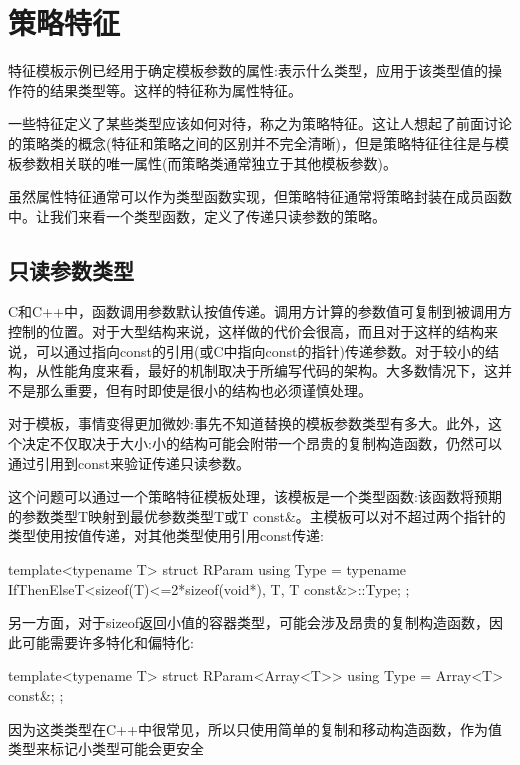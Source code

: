 \section{策略特征}

特征模板示例已经用于确定模板参数的属性:表示什么类型，应用于该类型值的操作符的结果类型等。这样的特征称为属性特征。

一些特征定义了某些类型应该如何对待，称之为策略特征。这让人想起了前面讨论的策略类的概念(特征和策略之间的区别并不完全清晰)，但是策略特征往往是与模板参数相关联的唯一属性(而策略类通常独立于其他模板参数)。

虽然属性特征通常可以作为类型函数实现，但策略特征通常将策略封装在成员函数中。让我们来看一个类型函数，定义了传递只读参数的策略。

\subsection{只读参数类型}

C和C++中，函数调用参数默认按值传递。调用方计算的参数值可复制到被调用方控制的位置。对于大型结构来说，这样做的代价会很高，而且对于这样的结构来说，可以通过指向const的引用(或C中指向const的指针)传递参数。对于较小的结构，从性能角度来看，最好的机制取决于所编写代码的架构。大多数情况下，这并不是那么重要，但有时即使是很小的结构也必须谨慎处理。

对于模板，事情变得更加微妙:事先不知道替换的模板参数类型有多大。此外，这个决定不仅取决于大小:小的结构可能会附带一个昂贵的复制构造函数，仍然可以通过引用到const来验证传递只读参数。

这个问题可以通过一个策略特征模板处理，该模板是一个类型函数:该函数将预期的参数类型T映射到最优参数类型T或T const\&。主模板可以对不超过两个指针的类型使用按值传递，对其他类型使用引用const传递:

\begin{cpp}
template<typename T>
struct RParam {
	using Type = typename IfThenElseT<sizeof(T)<=2*sizeof(void*),
									T,
									T const&>::Type;
};
\end{cpp}

另一方面，对于sizeof返回小值的容器类型，可能会涉及昂贵的复制构造函数，因此可能需要许多特化和偏特化:

\begin{cpp}
template<typename T>
struct RParam<Array<T>> {
	using Type = Array<T> const&;
};
\end{cpp}

因为这类类型在C++中很常见，所以只使用简单的复制和移动构造函数，作为值类型来标记小类型可能会更安全

